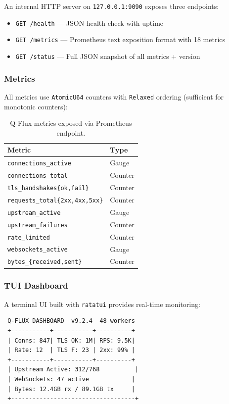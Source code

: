 \documentclass[11pt,a4paper,twocolumn]{article}
\begin{document}
An internal HTTP server on \texttt{127.0.0.1:9090} exposes three endpoints:

\begin{itemize}[nosep]
\item \texttt{GET /health} --- JSON health check with uptime
\item \texttt{GET /metrics} --- Prometheus text exposition format with 18 metrics
\item \texttt{GET /status} --- Full JSON snapshot of all metrics + version
\end{itemize}

\subsubsection{Metrics}

All metrics use \texttt{AtomicU64} counters with \texttt{Relaxed} ordering (sufficient for monotonic counters):

\begin{table}[H]
\centering
\footnotesize
\begin{tabular}{ll}
\toprule
\textbf{Metric} & \textbf{Type} \\
\midrule
\texttt{connections\_active} & Gauge \\
\texttt{connections\_total} & Counter \\
\texttt{tls\_handshakes\{ok,fail\}} & Counter \\
\texttt{requests\_total\{2xx,4xx,5xx\}} & Counter \\
\texttt{upstream\_active} & Gauge \\
\texttt{upstream\_failures} & Counter \\
\texttt{rate\_limited} & Counter \\
\texttt{websockets\_active} & Gauge \\
\texttt{bytes\_\{received,sent\}} & Counter \\
\bottomrule
\end{tabular}
\caption{Q-Flux metrics exposed via Prometheus endpoint.}
\end{table}

\subsubsection{TUI Dashboard}

A terminal UI built with \texttt{ratatui} provides real-time monitoring:

\begin{verbatim}
 Q-FLUX DASHBOARD  v9.2.4  48 workers
 +-----------+-----------+----------+
 | Conns: 847| TLS OK: 1M| RPS: 9.5K|
 | Rate: 12  | TLS F: 23 | 2xx: 99% |
 +-----------+-----------+----------+
 | Upstream Active: 312/768          |
 | WebSockets: 47 active            |
 | Bytes: 12.4GB rx / 89.1GB tx     |
 +-----------------------------------+
\end{verbatim}
\end{document}

